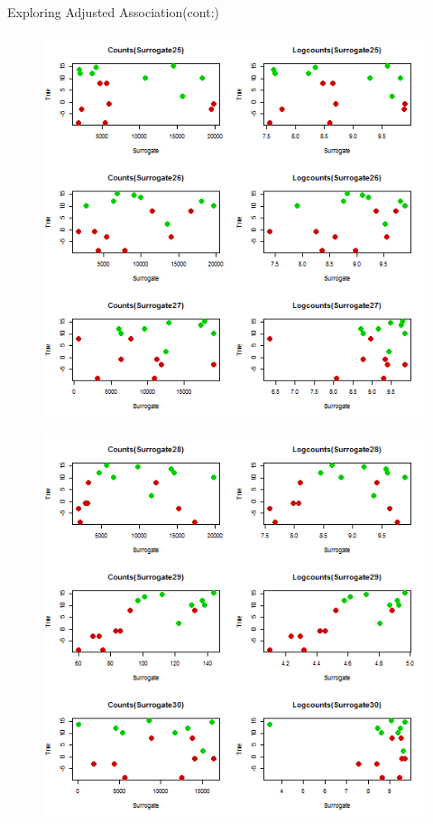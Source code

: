 \documentclass[a4paper,9pt]{beamer}\usepackage[]{graphicx}\usepackage[]{color}
\begin{document}
\begin{frame}{Exploring Adjusted Association(cont:)}
\begin{minipage}{0.3\textwidth}
\begin{figure}[H]
\includegraphics[scale=0.3]{first_presentation-figure/exploration-9.png}
\end{figure}
\end{minipage}
\hfill
\begin{minipage}{0.40\textwidth}
\begin{figure}[H]
\includegraphics[scale=0.3]{first_presentation-figure/exploration-10.png}
\end{figure}
\end{minipage}
\end{frame}
\end{document}
